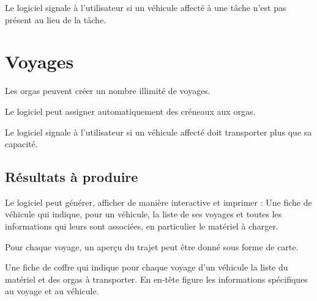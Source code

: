 Le logiciel signale à l'utilisateur si un véhicule affecté à une tâche n'est pas présent au lieu de la tâche.





\section{Voyages}

Les orgas peuvent créer un nombre illimité de voyages.

Le logiciel peut assigner automatiquement des créneaux aux orgas.

Le logiciel signale à l'utilisateur si un véhicule affecté doit transporter plus que sa capacité.

\subsection{Résultats à produire}
Le logiciel peut générer, afficher de manière interactive et imprimer :
Une fiche de véhicule qui indique, pour un véhicule, la liste de ses voyages et toutes les informations qui leurs sont associées, en particulier le matériel à charger.

Pour chaque voyage, un aperçu du trajet peut être donné sous forme de carte.

Une fiche de coffre qui indique pour chaque voyage d'un véhicule la liste du matériel et des orgas à transporter.
En en-tête figure les informations spécifiques au voyage et au véhicule.

